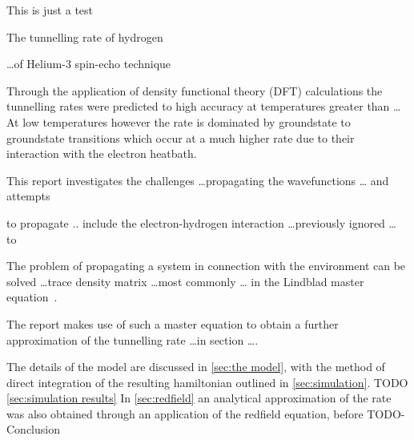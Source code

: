 
This is just a test

The tunnelling rate of
hydrogen

\ldots of Helium-3 spin-echo
technique~\cite{Helium_spin_echo}

Through the application of
density functional theory (DFT)
calculations the tunnelling
rates were predicted to high
accuracy at temperatures greater
than \ldots\cite{Jianding-Zhu}
At low temperatures however
the rate is dominated
by groundstate to groundstate
transitions which occur
at a much higher rate due to
their interaction with the
electron heatbath.

This report investigates
the challenges
\ldots propagating the
wavefunctions \ldots
and attempts

to propagate
..
include the electron-hydrogen
interaction \ldots previously ignored \ldots
to

The problem of propagating
a system in connection with
the environment can
be solved \ldots trace density matrix
\ldots most commonly \ldots
in the Lindblad master
equation~\cite{Manzano_2020}.

The report makes
use of such a master equation
to obtain a further
approximation of the
tunnelling rate \ldots in section \ldots.




The details of the model
are discussed in \cref{sec:the model},
with the method of
direct integration of the
resulting hamiltonian outlined
in \cref{sec:simulation}.
TODO \cref{sec:simulation results}
In \cref{sec:redfield} an
analytical approximation
of the rate was also obtained
through an application
of the redfield equation,
before TODO-Conclusion